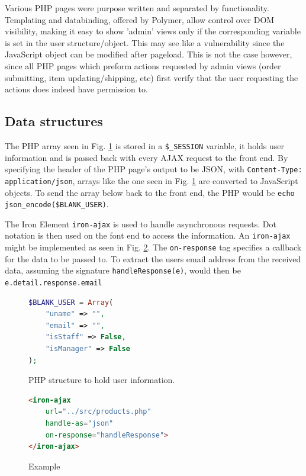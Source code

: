 \documentclass[letterpaper]{article}
\begin{document}
Various PHP pages were purpose written and separated by functionality. Templating and databinding, offered by Polymer, allow control over DOM visibility, making it easy to show 'admin' views only if the corresponding variable is set in the user structure/object. This may see like a vulnerability since the JavaScript object can be modified after pageload. This is not the case however, since all PHP pages which preform actions requested by admin views (order submitting, item updating/shipping, etc) first verify that the user requesting the actions does indeed have permission to. 

\subsection{Data structures}
The PHP array seen in Fig. \ref{user-struct} is stored in a \texttt{\$\_SESSION} variable, it holds user information and is passed back with every AJAX request to the front end. By specifying the header of the PHP page's output to be JSON, with \texttt{Content-Type: application/json}, arrays like the one seen in Fig. \ref{user-struct} are converted to JavaScript objects. To send the array below back to the front end, the PHP would be \texttt{echo json\_encode(\$BLANK\_USER)}. 

  The Iron Element \texttt{iron-ajax} is used to handle asynchronous requests. Dot notation is then used on the font end to access the information. An \texttt{iron-ajax} might be implemented as seen in Fig. \ref{ajax}. The \texttt{on-response} tag specifies a callback for the data to be passed to. To extract the users email address from the received data, assuming the signature \texttt{handleResponse(e)}, would then be \texttt{e.detail.response.email}
\begin{figure}[H]
\begin{adjustwidth}{.3\textwidth}{0cm}

\begin{lstlisting}[language=php]
$BLANK_USER = Array(
	"uname" => "",
	"email" => "",
	"isStaff" => False,
	"isManager" => False
);
\end{lstlisting}
\end{adjustwidth}
\caption{PHP structure to hold user information.}
\label{user-struct}
\end{figure}

\begin{figure}[H]
\begin{adjustwidth}{.3\textwidth}{0cm}

\begin{lstlisting}[language=html]
<iron-ajax
    url="../src/products.php"
    handle-as="json"
    on-response="handleResponse">
</iron-ajax>
\end{lstlisting}
\end{adjustwidth}
\caption{Example }
\label{ajax}
\end{figure}
\end{document}
